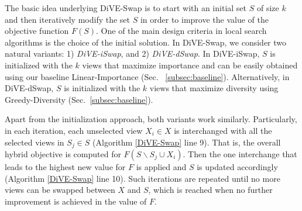 The basic idea underlying DiVE-Swap is to start with an initial set $S$ of size $k$ and then iteratively modify the set $S$ in order to improve the value of the objective function $F(S)$. 
%
One of the main design criteria in local search algorithms is the choice of the initial solution. 
%
In DiVE-Swap, we consider two natural variants: 1) {\em DiVE-iSwap}, and 2) {\em DiVE-dSwap}. 
%
In DiVE-iSwap, $S$ is initialized with the $k$ views that maximize importance and can be easily obtained using our baseline Linear-Importance (Sec. ~\ref{subsec:baseline}).
%
Alternatively, in DiVE-dSwap, $S$ is initialized with the $k$ views that maximize diversity using Greedy-Diversity (Sec.~\ref{subsec:baseline}).
%

Apart from the initialization approach, both variants work similarly. 
%
Particularly, in each iteration, each unselected view $X_i \in X$ is interchanged with all the selected views in $S_j \in S$ (Algorithm \ref{DiVE-Swap} line 9). 
%
That is, the overall hybrid objective is computed for $F(S \backslash S_j \cup X_i)$.  
%
Then the one interchange that leads to the highest new value for $F$ is applied and $S$ is updated accordingly (Algorithm \ref{DiVE-Swap} line 10). 
%
Such iterations are repeated until no more views can be swapped between $X$ and $S$, which is reached when no further improvement is achieved in the value of $F$.   


